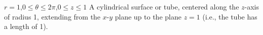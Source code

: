 {$r=1$,\quad $0\leq \theta\leq 2\pi$,\quad $0\leq z\leq 1$
}
{A cylindrical surface or tube, centered along the $z$-axis of radius 1, extending from the $x$-$y$ plane up to the plane $z=1$ (i.e., the tube has a length of 1).
}
